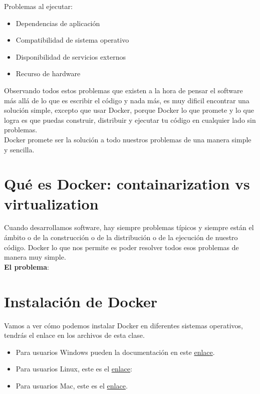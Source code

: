 \documentclass{article}
\begin{document}
Problemas al ejecutar:\\
\begin{itemize}
  \item Dependencias de aplicación
  \item Compatibilidad de sistema operativo
  \item Disponibilidad de servicios externos
  \item Recurso de hardware
\end{itemize}

Observando todos estos problemas que existen a la hora de pensar el software
más allá de lo que es escribir el código y nada más, es muy dificil encontrar
una solución simple, excepto que usar Docker, porque Docker lo que promete y lo
que logra es que puedas construir, distribuir y ejecutar tu código en cualquier
lado sin problemas.\\

Docker promete ser la solución a todo nuestros problemas de una manera simple y
sencilla.

\section{Qué es Docker: containarization vs virtualization}%
Cuando desarrollamos software, hay siempre problemas típicos y siempre están el
ámbito o de la construcción o de la distribución o de la ejecución de nuestro
código. Docker lo que nos permite es poder resolver todos esos problemas de
manera muy simple.\\

\textbf{El problema}: 

\section{Instalación de Docker}%
Vamos a ver cómo podemos instalar Docker en diferentes sistemas operativos,
tendrás el enlace en los archivos de esta clase.\\

\begin{itemize}
  \item Para usuarios Windows pueden la documentación en este
    \href{https://docs.docker.com/docker-for-windows/}{enlace}.
  \item Para usuarios Linux, este es el
    \href{https://docs.docker.com/install/linux/docker-ce/ubuntu/}{enlace}:
  \item Para usuarios Mac, este es el
    \href{https://docs.docker.com/docker-for-mac/}{enlace}.
\end{itemize}
\end{document}
